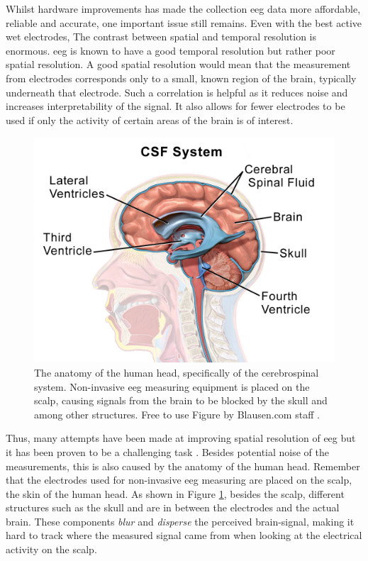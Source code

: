 Whilst hardware improvements has made the collection \gls{eeg} data more affordable, reliable and accurate, one important issue still remains.
Even with the best active wet electrodes, The contrast between spatial and temporal resolution is enormous.
\Gls{eeg} is known to have a good temporal resolution but rather poor spatial resolution.
A good spatial resolution would mean that the measurement from electrodes corresponds only to a small, known region of the brain, typically underneath that electrode.
Such a correlation is helpful as it reduces noise and increases interpretability of the signal.
It also allows for fewer electrodes to be used if only the activity of certain areas of the brain is of interest.

\begin{figure}[ht]
    \centering
    \includegraphics[width=0.7\linewidth]{images/introduction/brain_anatomy.png}
    \captionsetup{width=0.7\linewidth}
    \captionsetup{justification=centering}
    \caption{The anatomy of the human head, specifically of the cerebrospinal system. Non-invasive \gls{eeg} measuring equipment is placed on the scalp, causing signals from the brain to be blocked by the skull and  among other structures. Free to use Figure by Blausen.com staff \citep{figure_blausen}.}
    \label{fig:brain_anatomy}
\end{figure}

Thus, many attempts have been made at improving spatial resolution of \gls{eeg} but it has been proven to be a challenging task \citep{spatial_resolution}.
Besides potential noise of the measurements, this is also caused by the anatomy of the human head.
Remember that the electrodes used for non-invasive \gls{eeg} measuring are placed on the scalp, the skin of the human head.
As shown in Figure \ref{fig:brain_anatomy}, besides the scalp, different structures such as the skull and  are in between the electrodes and the actual brain.
These components \textit{blur} and \textit{disperse} the perceived brain-signal, making it hard to track where the measured signal came from when looking at the electrical activity on the scalp.

